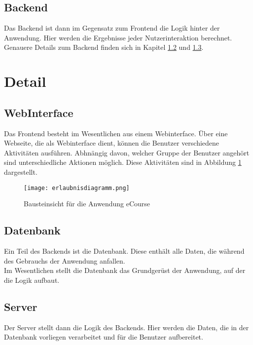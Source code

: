 \subsection{Backend}
Das \gls{Backend} ist dann im Gegensatz zum \gls{Frontend} die Logik hinter der Anwendung. Hier werden die Ergebnisse jeder Nutzerinteraktion berechnet. Genauere Details zum \gls{Backend} finden sich in Kapitel \ref{sec:Datenbank} und \ref{sec:Server}.

\section{Detail}

\subsection{WebInterface}
Das \gls{Frontend} besteht im Wesentlichen aus einem \gls{Webinterface}. Über eine Webseite, die als \gls{Webinterface} dient, können die Benutzer verschiedene Aktivitäten ausführen. Abhnängig davon, welcher Gruppe der Benutzer angehört sind unterschiedliche Aktionen möglich. 
Diese Aktivitäten sind in Abbildung \ref{fib:erlaubnis} dargestellt.

\begin{figure}[H]
\centering
\texttt{[image: erlaubnisdiagramm.png]}
\caption{Bausteinsicht für die Anwendung eCourse}
\label{fib:erlaubnis}
\end{figure}

\subsection{Datenbank}
\label{sec:Datenbank}
Ein Teil des \gls{Backend}s ist die Datenbank. Diese enthält alle Daten, die während des Gebrauchs der Anwendung anfallen. \\
Im Wesentlichen stellt die Datenbank das Grundgerüst der Anwendung, auf der die Logik aufbaut.


\subsection{Server}
\label{sec:Server}
Der Server stellt dann die Logik des \gls{Backend}s. Hier werden die Daten, die in der Datenbank vorliegen verarbeitet und für die Benutzer aufbereitet. 